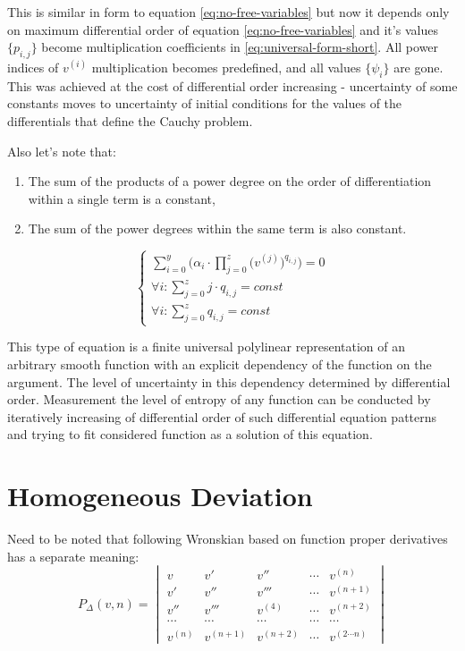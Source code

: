\documentclass[a4paper, 11pt, oneside]{book}
\begin{document}
This is similar in form to equation \ref{eq:no-free-variables} but now it depends only on maximum differential order of equation \ref{eq:no-free-variables} and it's values $\{p_{i, j}\}$ become multiplication coefficients in \ref{eq:universal-form-short}. All power indices of $v^{(i)}$ multiplication becomes predefined, and all values $\{\psi_i\}$ are gone. This was achieved at the cost of differential order increasing - uncertainty of some constants moves to uncertainty of initial conditions for the values of the differentials that define the Cauchy problem.

Also let's note that:
\begin{enumerate}
  \item The sum of the products of a power degree on the order of differentiation within a single term is a constant,
  \item The sum of the power degrees within the same term is also constant.
\end{enumerate}
\begin{equation}\label{eq:universal-form-long}
  \begin{cases}
    \displaystyle \sum_{i = 0}^y\bigg(\alpha_i \cdot \prod_{j=0}^z \Big(v^{(j)}\Big)^{q_{i, j}}\bigg) = 0 \\
    \displaystyle \forall i: \sum_{j = 0}^z j \cdot q_{i, j} = const \\
    \displaystyle \forall i: \sum_{j = 0}^z q_{i, j} = const
  \end{cases}
\end{equation}

This type of equation is a finite universal polylinear representation of an arbitrary smooth function with an explicit dependency of the function on the argument. The level of uncertainty in this dependency determined by differential order.
Measurement the level of entropy of any function can be conducted by iteratively increasing of differential order of such differential equation patterns and trying to fit considered function as a solution of this equation.

\section{Homogeneous Deviation}
Need to be noted that following Wronskian based on function proper derivatives has a separate meaning:
\begin{equation}\label{eq:wronskian-on-self-derivatives}
  P_{\Delta}(v, n) =
  \begin{vmatrix}
    v & v' & v'' & \cdots & v^{(n)} \\
    v' & v'' & v''' & \cdots & v^{(n+1)} \\
    v'' & v''' & v^{(4)} & \cdots & v^{(n+2)} \\
    \cdots & \cdots & \cdots & \cdots & \cdots \\
    v^{(n)} & v^{(n+1)} & v^{(n+2)} & \cdots & v^{(2 \cdots n)}
  \end{vmatrix}
\end{equation}
\end{document}
